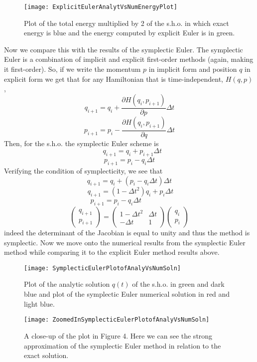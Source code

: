 \documentclass[12pt]{article}
\begin{document}
\begin{figure}[h!]
\centering
\texttt{[image: ExplicitEulerAnalytVsNumEnergyPlot]}
\caption{Plot of the total energy multiplied by 2 of the s.h.o. in which exact energy is blue and the energy computed by explicit Euler is in green.}
\end{figure}
\indent Now we compare this with the results of the symplectic Euler. The symplectic Euler is a combination of implicit and explicit first-order methods (again, making it first-order). So, if we write the momentum $p$ in implicit form and position $q$ in explicit form we get that for any Hamiltonian that is time-independent, $H(q,p)$,
\[q_{i+1}=q_i+\frac{\partial H(q_i,p_{i+1})}{\partial p}\Delta t\]
\[p_{i+1}=p_i-\frac{\partial H(q_i,p_{i+1})}{\partial q}\Delta t\]
Then, for the s.h.o. the symplectic Euler scheme is
\[\;\;\;q_{i+1}=q_i+p_{i+1}\Delta t\]
\[p_{i+1}=p_i-q_i\Delta t\]
Verifying the condition of symplecticity, we see that
\[q_{i+1}=q_i+(p_i-q_i\Delta t)\Delta t\]
\[\;q_{i+1}=(1-{\Delta t}^{2})q_i+p_i\Delta t\]
\[p_{i+1}=p_i-q_i\Delta t\;\;\;\;\;\;\;\;\;\;\;\;\;\;\]
\[\left (\begin{matrix}
  q_{i+1}  \\
  p_{i+1} 
 \end{matrix}\right)=
\left(\begin{matrix}
  1-{\Delta t}^{2} & \Delta t \\
  -\Delta t & 1 
 \end{matrix}\right)
\left(\begin{matrix}
  q_i  \\
  p_i 
 \end{matrix}\right)\]
indeed the determinant of the Jacobian is equal to unity and thus the method is symplectic. Now we move onto the numerical results from the symplectic Euler method while comparing it to the explicit Euler method results above.
\begin{figure}[h!]
\begin{minipage}[b]{0.45\linewidth}
\centering
\texttt{[image: SymplecticEulerPlotofAnalyVsNumSoln]}
\caption{Plot of the analytic solution $q(t)$ of the s.h.o. in green and dark blue and plot of the symplectic Euler numerical solution in red and light blue.}
\label{fig:figure4}
\end{minipage}
\hspace{0.5cm}
\begin{minipage}[b]{0.45\linewidth}
\centering
\texttt{[image: ZoomedInSymplecticEulerPlotofAnalyVsNumSoln]}
\caption{A close-up of the plot in Figure 4. Here we can see the strong approximation of the symplectic Euler method in relation to the exact solution.}
\label{fig:figure5}
\end{minipage}
\end{figure}
\end{document}
